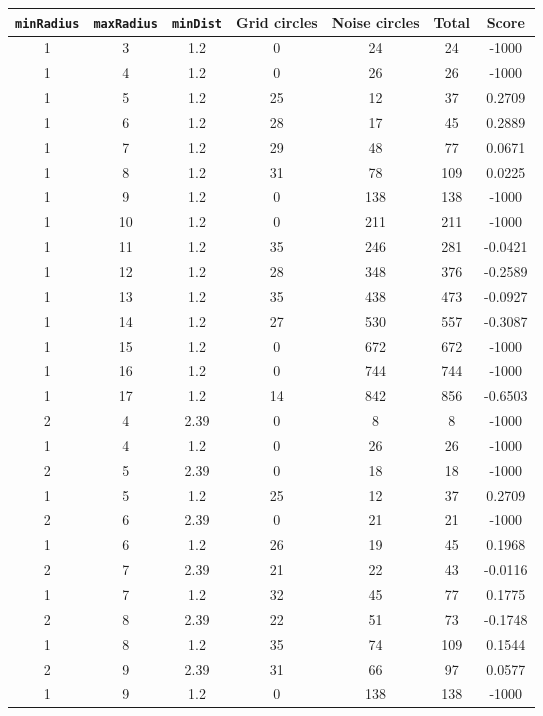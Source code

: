 \documentclass[letterpaper, 12pt]{article}
\begin{document}
\begin{longtable}{|c|c|c|c|c|c|c|}
\hline
\textbf{\texttt{minRadius}} & \textbf{\texttt{maxRadius}} & \textbf{\texttt{minDist}} & \textbf{Grid circles} & \textbf{Noise circles} & \textbf{Total} & \textbf{Score} \\
\hline
1 & 3 & 1.2 & 0 & 24 & 24 & -1000 \\
\hline
1 & 4 & 1.2 & 0 & 26 & 26 & -1000 \\
\hline
1 & 5 & 1.2 & 25 & 12 & 37 & 0.2709 \\
\hline
1 & 6 & 1.2 & 28 & 17 & 45 & 0.2889 \\
\hline
1 & 7 & 1.2 & 29 & 48 & 77 & 0.0671 \\
\hline
1 & 8 & 1.2 & 31 & 78 & 109 & 0.0225 \\
\hline
1 & 9 & 1.2 & 0 & 138 & 138 & -1000 \\
\hline
1 & 10 & 1.2 & 0 & 211 & 211 & -1000 \\
\hline
1 & 11 & 1.2 & 35 & 246 & 281 & -0.0421 \\
\hline
1 & 12 & 1.2 & 28 & 348 & 376 & -0.2589 \\
\hline
1 & 13 & 1.2 & 35 & 438 & 473 & -0.0927 \\
\hline
1 & 14 & 1.2 & 27 & 530 & 557 & -0.3087 \\
\hline
1 & 15 & 1.2 & 0 & 672 & 672 & -1000 \\
\hline
1 & 16 & 1.2 & 0 & 744 & 744 & -1000 \\
\hline
1 & 17 & 1.2 & 14 & 842 & 856 & -0.6503 \\
\hline
2 & 4 & 2.39 & 0 & 8 & 8 & -1000 \\
\hline
1 & 4 & 1.2 & 0 & 26 & 26 & -1000 \\
\hline
2 & 5 & 2.39 & 0 & 18 & 18 & -1000 \\
\hline
1 & 5 & 1.2 & 25 & 12 & 37 & 0.2709 \\
\hline
2 & 6 & 2.39 & 0 & 21 & 21 & -1000 \\
\hline
1 & 6 & 1.2 & 26 & 19 & 45 & 0.1968 \\
\hline
2 & 7 & 2.39 & 21 & 22 & 43 & -0.0116 \\
\hline
1 & 7 & 1.2 & 32 & 45 & 77 & 0.1775 \\
\hline
2 & 8 & 2.39 & 22 & 51 & 73 & -0.1748 \\
\hline
1 & 8 & 1.2 & 35 & 74 & 109 & 0.1544 \\
\hline
2 & 9 & 2.39 & 31 & 66 & 97 & 0.0577 \\
\hline
1 & 9 & 1.2 & 0 & 138 & 138 & -1000 \\

\end{longtable}
\end{document}
